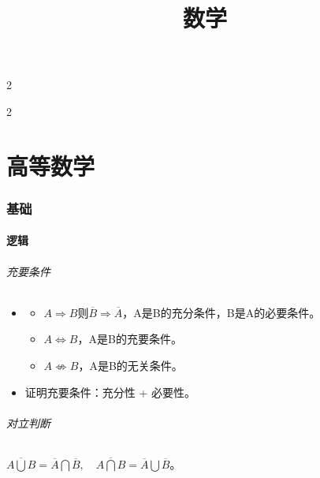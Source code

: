 \documentclass[
12pt, %
a4paper, 
oneside, %
]{scrartcl}
\title{数学}
\date{}
\begin{document}
\maketitle
\newpage
\hypertarget{toc}{}
\begingroup
\begin{multicols}{2}
\tableofcontents
\end{multicols}
\endgroup
\newpage
\begingroup
\begin{multicols}{2}
\listoftips
\end{multicols}
\endgroup
\newpage
\part{高等数学}
\section{基础}
\subsection[逻辑]{逻辑}
\paragraph{充要条件}
\begin{itemize}
\item     
\begin{itemize}    
\item $ A \Rightarrow B $则$ \overline{B} \Rightarrow \overline{A} $，A是B的充分条件，B是A的必要条件。
\item $ A \Leftrightarrow B $，A是B的充要条件。
\item $ A \not\Leftrightarrow B $，A是B的无关条件。
\end{itemize}
\item 证明充要条件：充分性 + 必要性。
\end{itemize}
\paragraph{对立判断}
$ \overline{A \bigcup B} = \overline{A} \bigcap \overline{B}, \quad \overline{A \bigcap B} = \overline{A} \bigcup \overline{B}$。
\end{document}
